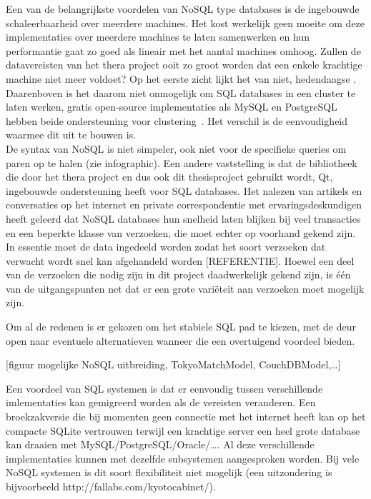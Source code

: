 Een van de belangrijkste voordelen van NoSQL type databases is de ingebouwde schaleerbaarheid over meerdere machines. Het kost werkelijk geen moeite om deze implementaties over meerdere machines te laten samenwerken en hun performantie gaat zo goed als lineair met het aantal machines omhoog. Zullen de datavereisten van het thera project ooit zo groot worden dat een enkele krachtige machine niet meer voldoet? Op het eerste zicht lijkt het van niet, hedendaagse . Daarenboven is het daarom niet onmogelijk om SQL databases in een cluster te laten werken, gratis open-source implementaties als MySQL en PostgreSQL hebben beide ondersteuning voor clustering~\cite{postgrescluster, mysqlcluster}. Het verschil is de eenvoudigheid waarmee dit uit te bouwen is.\\

De syntax van NoSQL is niet simpeler, ook niet voor de specifieke queries om paren op te halen (zie infographic). Een andere vaststelling is dat de bibliotheek die door het thera project en dus ook dit thesisproject gebruikt wordt, Qt, ingebouwde ondersteuning heeft voor SQL databases. Het nalezen van artikels en conversaties op het internet en private correspondentie met ervaringsdeskundigen heeft geleerd dat NoSQL databases hun snelheid laten blijken bij veel transacties en een beperkte klasse van verzoeken, die moet echter op voorhand gekend zijn\cite{cassandradatamodel}. In essentie moet de data ingedeeld worden zodat het soort verzoeken dat verwacht wordt snel kan afgehandeld worden [REFERENTIE]. Hoewel een deel van de verzoeken die nodig zijn in dit project daadwerkelijk gekend zijn, is \'e\'en van de uitgangspunten net dat er een grote vari\"eteit aan verzoeken moet mogelijk zijn.  

Om al de redenen is er gekozen om het stabiele SQL pad te kiezen, met de deur open naar eventuele alternatieven wanneer die een overtuigend voordeel bieden.

[figuur mogelijke NoSQL uitbreiding, TokyoMatchModel, CouchDBModel,\ldots] 

Een voordeel van SQL systemen is dat er eenvoudig tussen verschillende imlementaties kan gemigreerd worden als de vereisten veranderen. Een broekzakversie die bij momenten geen connectie met het internet heeft kan op het compacte SQLite vertrouwen terwijl een krachtige server een heel grote database kan draaien met MySQL/PostgreSQL/Oracle/\ldots. Al deze verschillende implementaties kunnen met dezelfde subsystemen aangesproken worden. Bij vele NoSQL systemen is dit soort flexibiliteit niet mogelijk (een uitzondering is bijvoorbeeld http://fallabs.com/kyotocabinet/).\\

